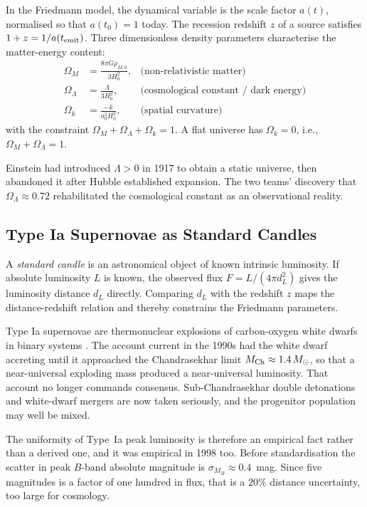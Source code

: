 \documentclass[12pt]{article}
\begin{document}
In the Friedmann model, the dynamical variable is the scale factor
$a(t)$, normalised so that $a(t_0) = 1$ today.  The recession redshift
$z$ of a source satisfies $1+z = 1/a(t_{\rm emit})$.  Three dimensionless
density parameters characterise the matter-energy content:
\begin{align}
  \Omega_M &= \frac{8\pi G\rho_{M,0}}{3H_0^2},
  &\text{(non-relativistic matter)}\label{eq:omegaM}\\[4pt]
  \Omega_\Lambda &= \frac{\Lambda}{3H_0^2},
  &\text{(cosmological constant / dark energy)}\label{eq:omegaL}\\[4pt]
  \Omega_k &= \frac{-k}{a_0^2 H_0^2},
  &\text{(spatial curvature)}\label{eq:omegak}
\end{align}
with the constraint $\Omega_M + \Omega_\Lambda + \Omega_k = 1$.  A flat
universe has $\Omega_k = 0$, i.e., $\Omega_M + \Omega_\Lambda = 1$.

Einstein had introduced $\Lambda > 0$ in 1917 \citeyearpar{Einstein1917}
to obtain a static universe, then abandoned it after Hubble established
expansion.  The two teams' discovery that $\Omega_\Lambda \approx 0.72$
rehabilitated the cosmological constant as an observational reality.

\subsection{Type Ia Supernovae as Standard Candles}
\label{sec:standard_candle}

A \emph{standard candle} is an astronomical object of known intrinsic
luminosity.  If absolute luminosity $L$ is known, the observed flux
$F = L/(4\pi d_L^2)$ gives the luminosity distance $d_L$ directly.
Comparing $d_L$ with the redshift $z$ maps the distance-redshift relation
and thereby constrains the Friedmann parameters.

Type Ia supernovae are thermonuclear explosions of carbon-oxygen white
dwarfs in binary systems \citep{Filippenko1997}.  The account current in the
1990s had the white dwarf accreting until it approached the Chandrasekhar
limit $M_{\rm Ch} \approx 1.4\,M_\odot$, so that a near-universal exploding
mass produced a near-universal luminosity.  That account no longer commands
consensus.  Sub-Chandrasekhar double detonations and white-dwarf mergers are
now taken seriously, and the progenitor population may well be mixed.

The uniformity of Type~Ia peak luminosity is therefore an empirical fact
rather than a derived one, and it was empirical in 1998 too.  Before
standardisation the scatter in peak $B$-band absolute magnitude is
$\sigma_{M_B} \approx 0.4$~mag.  Since five magnitudes is a factor of one
hundred in flux, that is a $20\%$ distance uncertainty, too large for
cosmology.
\end{document}
